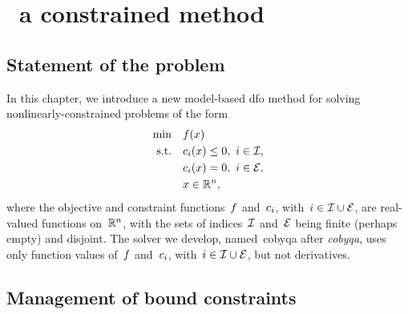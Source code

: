 %
%
%
\chapter{ \textemdash\ a constrained  method}
\label{ch:cobyqa-introduction}

\section{Statement of the problem}

In this chapter, we introduce a new model-based \gls{dfo} method for solving nonlinearly-constrained problems of the form
\begin{subequations}
    \label{eq:problem-cobyqa}
    \begin{align}
        \min        & \quad \obj(\iter) \label{eq:problem-cobyqa-obj}\\
        \text{s.t.} & \quad \con{i}(\iter) \le 0, ~ i \in \iub, \label{eq:problem-cobyqa-ub}\\
                    & \quad \con{i}(\iter) = 0, ~ i \in \ieq,\\
                    & \quad \iter \in \R^n, \nonumber
    \end{align}
\end{subequations}
where the objective and constraint functions~$f$ and~$c_{i}$, with~$i \in \mathcal{I} \cup \mathcal{E}$, are real-valued functions on~$\mathbb{R}^n$, with the sets of indices~$\mathcal{I}$ and~$\mathcal{E}$ being finite (perhaps empty) and disjoint.
The solver we develop, named~\gls{cobyqa} after \emph{\glsdesc{cobyqa}}, uses only function values of~$f$ and~$c_{i}$, with~$i \in \mathcal{I} \cup \mathcal{E}$, but not derivatives.

\section{Management of bound constraints}

